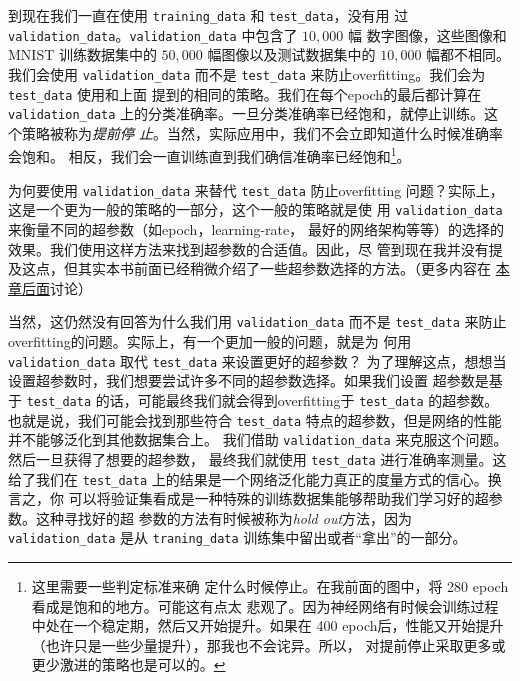 到现在我们一直在使用 \lstinline!training_data! 和 \lstinline!test_data!，没有用
过 \lstinline!validation_data!。\lstinline!validation_data! 中包含了 $10,000$ 幅
数字图像，这些图像和 MNIST 训练数据集中的 $50,000$ 幅图像以及测试数据集中的
$10,000$ 幅都不相同。我们会使用 \lstinline!validation_data! 而不是
\lstinline!test_data! 来防止\gls*{overfitting}。我们会为 \lstinline!test_data! 使用和上面
提到的相同的策略。我们在每个\gls*{epoch}的最后都计算在 \lstinline!validation_data!
上的分类准确率。一旦分类准确率已经饱和，就停止训练。这个策略被称为\emph{提前停
  止}。当然，实际应用中，我们不会立即知道什么时候准确率会饱和。
相反，我们会一直训练直到我们确信准确率已经饱和\footnote{这里需要一些判定标准来确
  定什么时候停止。在我前面的图中，将 280 \gls*{epoch}看成是饱和的地方。可能这有点太
  悲观了。因为神经网络有时候会训练过程中处在一个稳定期，然后又开始提升。如果在
  400 \gls*{epoch}后，性能又开始提升（也许只是一些少量提升），那我也不会诧异。所以，
  对提前停止采取更多或更少激进的策略也是可以的。}。

\label{validation_explanation}
为何要使用 \lstinline!validation_data! 来替代 \lstinline!test_data! 防止\gls*{overfitting}
问题？实际上，这是一个更为一般的策略的一部分，这个一般的策略就是使
用 \lstinline!validation_data! 来衡量不同的超参数（如\gls*{epoch}，\gls*{learning-rate}，
最好的网络架构等等）的选择的效果。我们使用这样方法来找到超参数的合适值。因此，尽
管到现在我并没有提及这点，但其实本书前面已经稍微介绍了一些超参数选择的方法。（更多内容在%
\hyperref[sec:how_to_choose_a_neural_network's_hyper-parameters]{本章后面}讨论）

当然，这仍然没有回答为什么我们用 \lstinline!validation_data! 而不是
\lstinline!test_data! 来防止\gls*{overfitting}的问题。实际上，有一个更加一般的问题，就是为
何用 \lstinline!validation_data! 取代 \lstinline!test_data! 来设置更好的超参数？
为了理解这点，想想当设置超参数时，我们想要尝试许多不同的超参数选择。如果我们设置
超参数是基于 \lstinline!test_data! 的话，可能最终我们就会得到\gls*{overfitting}于
\lstinline!test_data!  的超参数。也就是说，我们可能会找到那些符合
\lstinline!test_data! 特点的超参数，但是网络的性能并不能够泛化到其他数据集合上。
我们借助 \lstinline!validation_data! 来克服这个问题。然后一旦获得了想要的超参数，
最终我们就使用 \lstinline!test_data! 进行准确率测量。这给了我们在
\lstinline!test_data! 上的结果是一个网络泛化能力真正的度量方式的信心。换言之，你
可以将验证集看成是一种特殊的训练数据集能够帮助我们学习好的超参数。这种寻找好的超
参数的方法有时候被称为\emph{hold out}方法，因为 \lstinline!validation_data! 是从
\lstinline!traning_data! 训练集中留出或者“拿出”的一部分。

